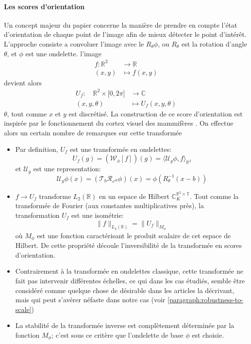 \documentclass{article}
\begin{document}
\paragraph{Les scores d'orientation} 
Un concept majeur du papier concerne la manière de prendre en compte l'état
d'orientation de chaque point de l'image afin de mieux détecter le point d'intérêt.
L'approche consiste a convoluer l'image avec le $ R_{\theta} \phi $, ou $ R_{\theta} $
est la rotation d'angle $ \theta  $, et $ \phi $ est une ondelette.
l'image 
\[
    \begin{aligned}
        f: \mathbb{R}^2 &\longrightarrow \mathbb{R} \\
        (x, y) &\longmapsto f(x, y)
    \end{aligned}
\] 
devient alors 
\[
\begin{aligned}
    U_f: \quad \mathbb{R}^2\times \lbrack  0, 2 \pi \rbrack &\longrightarrow \mathbb{C} \\
    (x, y, \theta) &\longmapsto U_f(x, y, \theta)
\end{aligned}
\] 
$ \theta $, tout comme $ x $ et $ y $ est discrétisé.
La construction de ce score d'orientation est inspirée par le fonctionnement du cortex
visuel des mammifères \cite{cake2}.
On effectue alors un certain nombre de remarques sur cette transformée
\begin{itemize}
    \item Par definition, $  U_f $ est une transformée en ondelettes:
        \[
             U_f(g) =  (\mathcal W_{\phi}[f])(g)  = \langle \mathcal  U_g \phi, f
             \rangle_{\mathbb{R}^2}
        \] 
        et $ \mathcal  U_g $ est une representation:
        \[
            \mathcal  U_g \phi(x) = (\mathcal  T_b \mathcal  R_{e^{i \theta}} \phi )(x)
            = \phi \left ( R_{\theta}^{-1}(x - b) \right )
        \] 
        \item $ f  \to U_f $ transforme $ L_2(\mathbb{R}) $ en un espace de Hilbert $
        \mathbb C_K^{\mathbb{R}^2 \times \mathbb{ T }} $.\newline
        Tout comme la transformée de Fourier (aux constantes multiplicatives près), la
        transformation $ U_f $ est une isométrie:
        \[
            \|f\|_{L_2(\mathbb{R})} = \|U_f\|_{M_{\phi}}
        \] 
        où $ M_{\phi} $ est une fonction caractérisant le produit scalaire de cet espace
        de Hilbert.\newline
        De cette propriété découle l'inversibilité de la transformée en scores
        d'orientation.
        \item Contrairement à la transformée en ondelettes classique, cette transformée
            ne fait pas intervenir différentes échelles, ce qui dans les cas étudiés,
            semble être considéré comme quelque chose de désirable dans les articles la
            décrivant, mais qui peut s'avérer néfaste dans notre cas (voir \ref{paragraph:robustness-to-scale}) 
        \item La stabilité de la transformée inverse est complètement déterminée par la
            fonction $ M_{\phi} $; c'est sous ce critère que l'ondelette de base $ \phi
            $ est choisie.
\end{itemize}
\end{document}
